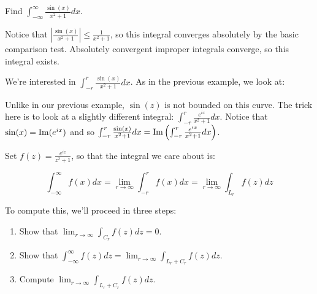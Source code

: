 \begin{ex}{}{} Find $\int_{-\infty}^\infty \frac{\sin(x)}{x^2+ 1}dx$.

Notice that $\left|\frac{\sin(x)}{x^2+1}\right| \le \frac{1}{x^2+1}$, so this integral converges absolutely by the basic comparison test. Absolutely convergent improper integrals converge, so this integral exists.

We're interested in $\int_{-r}^r \frac{\sin(x)}{x^2 +1}dx$. As in the previous example, we look at:

\begin{center}
\end{center}

Unlike in our previous example, $\sin(z)$ is not bounded on this curve. The trick here is to look at a slightly different integral: $\int_{-r}^r \frac{e^{ix}}{x^2+1}dx$. Notice that $\sin(x) = \operatorname{Im}(e^{ix})$ and so $\int_{-r}^r \frac{\sin(x)}{x^2+1}dx  = \operatorname{Im} \left(\int_{-r}^r \frac{e^{ix}}{x^2+1}dx\right)$.


Set $f(z) = \frac{e^{iz}}{z^2+1}$, so that the integral we care about is:

$$\int_{-\infty}^\infty f(x)dx = \lim_{r\rightarrow \infty} \int_{-r}^r f(x)dx = \lim_{r\rightarrow \infty} \int_{L_r}f(z)dz$$

To compute this, we'll proceed in three steps:

\begin{enumerate}
\item Show that $\lim_{r\rightarrow \infty} \int_{C_r} f(z)dz = 0$.
\item Show that $\int_{-\infty}^\infty f(z)dz = \lim_{r\rightarrow \infty} \int_{L_r + C_r} f(z)dz$.
\item Compute $\lim_{r\rightarrow \infty} \int_{L_r + C_r} f(z)dz$.
\end{enumerate}


\end{ex}
